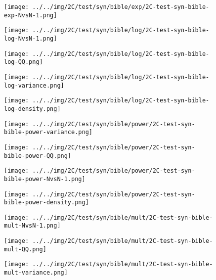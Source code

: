 \begin{figure}[H]
\centering	\texttt{[image: ../../img/2C/test/syn/bible/exp/2C-test-syn-bible-exp-NvsN-1.png]}
\end{figure}
\begin{figure}[H]
\centering	\texttt{[image: ../../img/2C/test/syn/bible/log/2C-test-syn-bible-log-NvsN-1.png]}
\end{figure}
\begin{figure}[H]
\centering	\texttt{[image: ../../img/2C/test/syn/bible/log/2C-test-syn-bible-log-QQ.png]}
\end{figure}
\begin{figure}[H]
\centering	\texttt{[image: ../../img/2C/test/syn/bible/log/2C-test-syn-bible-log-variance.png]}
\end{figure}
\begin{figure}[H]
\centering	\texttt{[image: ../../img/2C/test/syn/bible/log/2C-test-syn-bible-log-density.png]}
\end{figure}
\begin{figure}[H]
\centering	\texttt{[image: ../../img/2C/test/syn/bible/power/2C-test-syn-bible-power-variance.png]}
\end{figure}
\begin{figure}[H]
\centering	\texttt{[image: ../../img/2C/test/syn/bible/power/2C-test-syn-bible-power-QQ.png]}
\end{figure}
\begin{figure}[H]
\centering	\texttt{[image: ../../img/2C/test/syn/bible/power/2C-test-syn-bible-power-NvsN-1.png]}
\end{figure}
\begin{figure}[H]
\centering	\texttt{[image: ../../img/2C/test/syn/bible/power/2C-test-syn-bible-power-density.png]}
\end{figure}
\begin{figure}[H]
\centering	\texttt{[image: ../../img/2C/test/syn/bible/mult/2C-test-syn-bible-mult-NvsN-1.png]}
\end{figure}
\begin{figure}[H]
\centering	\texttt{[image: ../../img/2C/test/syn/bible/mult/2C-test-syn-bible-mult-QQ.png]}
\end{figure}
\begin{figure}[H]
\centering	\texttt{[image: ../../img/2C/test/syn/bible/mult/2C-test-syn-bible-mult-variance.png]}
\end{figure}
